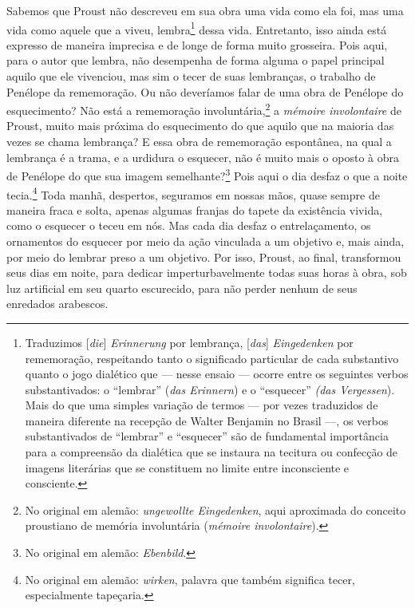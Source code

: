 Sabemos que Proust não descreveu em sua obra uma vida como ela foi, mas
uma vida como aquele que a viveu, lembra\footnote{Traduzimos
  {[}\emph{die}{]} \emph{Erinnerung} por lembrança, {[}\emph{das}{]}
  \emph{Eingedenken} por rememoração, respeitando tanto o significado
  particular de cada substantivo quanto o jogo dialético que --- nesse
  ensaio --- ocorre entre os seguintes verbos substantivados: o ``lembrar'' (\emph{das Erinnern}) e o ``esquecer'' \emph{(das
  Vergessen}). Mais do que uma simples variação de termos --- por vezes
  traduzidos de maneira diferente na recepção de Walter Benjamin no
  Brasil ---, os verbos substantivados de ``lembrar'' e ``esquecer'' são
  de fundamental importância para a compreensão da dialética que se
  instaura na tecitura ou confecção de imagens literárias que se
  constituem no limite entre inconsciente e consciente. \versal{[N.~T.]}} dessa vida.
Entretanto, isso ainda está expresso de maneira imprecisa e de longe de
forma muito grosseira. Pois aqui, para o autor que lembra, não
desempenha de forma alguma o papel principal aquilo que ele vivenciou,
mas sim o tecer de suas lembranças, o trabalho de Penélope da
rememoração. Ou não deveríamos falar de uma obra de Penélope do
esquecimento? Não está a rememoração involuntária,\footnote{No
  original em alemão: \emph{ungewollte Eingedenken}, aqui aproximada do
  conceito proustiano de memória involuntária (\emph{mémoire
  involontaire}). \versal{[N.~T.]}} a \emph{mémoire involontaire} de Proust, muito mais
próxima do esquecimento do que aquilo que na maioria das vezes se chama
lembrança? E essa obra de rememoração espontânea, na qual a lembrança é
a trama, e a urdidura o esquecer, não é muito mais o oposto à obra de
Penélope do que sua imagem semelhante?\footnote{No original em alemão:
  \emph{Ebenbild}. \versal{[N.~T.]}} Pois aqui o dia desfaz o que a noite
tecia.\footnote{No original em alemão: \emph{wirken}, palavra que
  também significa tecer, especialmente tapeçaria. \versal{[N.~T.]}} Toda manhã,
despertos, seguramos em nossas mãos, quase sempre de maneira fraca e
solta, apenas algumas franjas do tapete da existência vivida, como o
esquecer o teceu em nós. Mas cada dia desfaz o entrelaçamento, os
ornamentos do esquecer por meio da ação vinculada a um objetivo e, mais
ainda, por meio do lembrar preso a um objetivo. Por isso, Proust, ao
final, transformou seus dias em noite, para dedicar imperturbavelmente
todas suas horas à obra, sob luz artificial em seu quarto escurecido,
para não perder nenhum de seus enredados arabescos.

